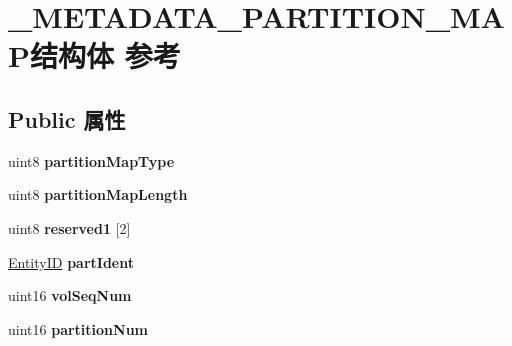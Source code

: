 \hypertarget{struct___m_e_t_a_d_a_t_a___p_a_r_t_i_t_i_o_n___m_a_p}{}\section{\+\_\+\+M\+E\+T\+A\+D\+A\+T\+A\+\_\+\+P\+A\+R\+T\+I\+T\+I\+O\+N\+\_\+\+M\+A\+P结构体 参考}
\label{struct___m_e_t_a_d_a_t_a___p_a_r_t_i_t_i_o_n___m_a_p}
\subsection*{Public 属性}
\begin{DoxyCompactItemize}
\item 
\mbox{\label{struct___m_e_t_a_d_a_t_a___p_a_r_t_i_t_i_o_n___m_a_p_a4b8d3fac65cbd31a7f1fd0aa78b4e563}} 
uint8 {\bfseries partition\+Map\+Type}
\item 
\mbox{\label{struct___m_e_t_a_d_a_t_a___p_a_r_t_i_t_i_o_n___m_a_p_a669b91a7d32715fddc13b240fc120960}} 
uint8 {\bfseries partition\+Map\+Length}
\item 
\mbox{\label{struct___m_e_t_a_d_a_t_a___p_a_r_t_i_t_i_o_n___m_a_p_a5cd08bfd5cdb32284e310af3b988eeb4}} 
uint8 {\bfseries reserved1} \mbox{[}2\mbox{]}
\item 
\mbox{\label{struct___m_e_t_a_d_a_t_a___p_a_r_t_i_t_i_o_n___m_a_p_a4d8c241672b524bf280989b26da4b1a4}} 
\hyperlink{struct_entity_i_d}{Entity\+ID} {\bfseries part\+Ident}
\item 
\mbox{\label{struct___m_e_t_a_d_a_t_a___p_a_r_t_i_t_i_o_n___m_a_p_ad0603883664b968388f8bb9a1dedb976}} 
uint16 {\bfseries vol\+Seq\+Num}
\item 
\mbox{\label{struct___m_e_t_a_d_a_t_a___p_a_r_t_i_t_i_o_n___m_a_p_ac99669c147d61838a15066b6eb17663e}} 
uint16 {\bfseries partition\+Num}
\item 

\end{DoxyCompactItemize}
